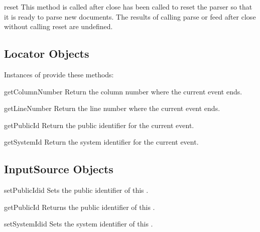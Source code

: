 \begin{methoddesc}[IncrementalParser]{reset}{}
  This method is called after close has been called to reset the
  parser so that it is ready to parse new documents. The results of
  calling parse or feed after close without calling reset are
  undefined.
\end{methoddesc}


\subsection{Locator Objects \label{locator-objects}}

Instances of  provide these methods:

\begin{methoddesc}[Locator]{getColumnNumber}{}
  Return the column number where the current event ends.
\end{methoddesc}

\begin{methoddesc}[Locator]{getLineNumber}{}
  Return the line number where the current event ends.
\end{methoddesc}

\begin{methoddesc}[Locator]{getPublicId}{}
  Return the public identifier for the current event.
\end{methoddesc}

\begin{methoddesc}[Locator]{getSystemId}{}
  Return the system identifier for the current event.
\end{methoddesc}


\subsection{InputSource Objects \label{input-source-objects}}

\begin{methoddesc}[InputSource]{setPublicId}{id}
  Sets the public identifier of this .
\end{methoddesc}

\begin{methoddesc}[InputSource]{getPublicId}{}
  Returns the public identifier of this .
\end{methoddesc}

\begin{methoddesc}[InputSource]{setSystemId}{id}
  Sets the system identifier of this .
\end{methoddesc}

